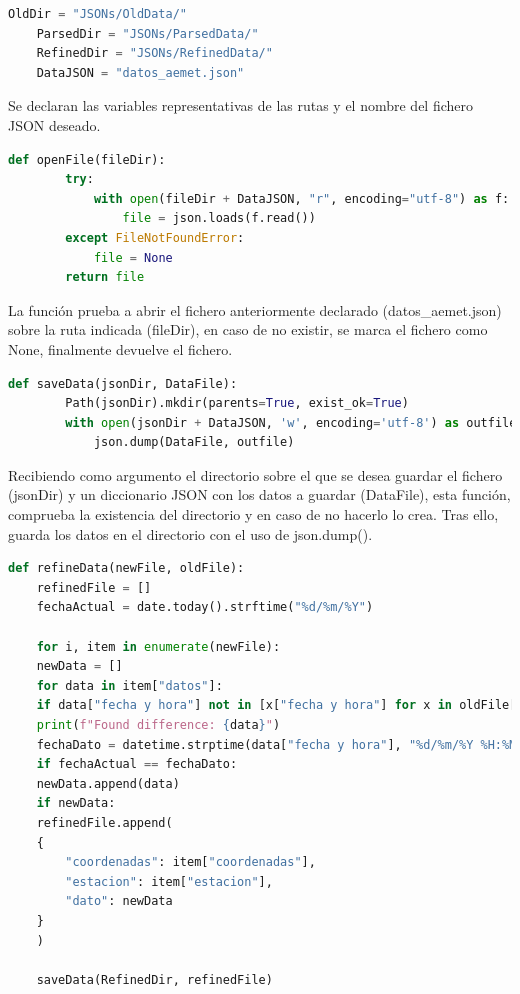 \begin{lstlisting}[language=Python, caption={Declaración rutas JSONs y nombre de fichero}]
	OldDir = "JSONs/OldData/"
	ParsedDir = "JSONs/ParsedData/"
	RefinedDir = "JSONs/RefinedData/"
	DataJSON = "datos_aemet.json"
\end{lstlisting}

Se declaran las variables representativas de las rutas y el nombre del fichero JSON deseado.

\begin{lstlisting}[language=Python, caption={Declaración función openFile()}]
	def openFile(fileDir):
		try:
			with open(fileDir + DataJSON, "r", encoding="utf-8") as f:
				file = json.loads(f.read())
		except FileNotFoundError:
			file = None
		return file
\end{lstlisting}

La función prueba a abrir el fichero anteriormente declarado (datos\_aemet.json) sobre la ruta indicada (fileDir), en caso de no existir, se marca el fichero como None, finalmente devuelve el fichero.

\begin{lstlisting}[language=Python, caption={Declaración función saveFile()}]
	def saveData(jsonDir, DataFile):
		Path(jsonDir).mkdir(parents=True, exist_ok=True)
		with open(jsonDir + DataJSON, 'w', encoding='utf-8') as outfile:
			json.dump(DataFile, outfile)
\end{lstlisting}

Recibiendo como argumento el directorio sobre el que se desea guardar el fichero (jsonDir) y un diccionario JSON con los datos a guardar (DataFile), esta función, comprueba la existencia del directorio y en caso de no hacerlo lo crea. Tras ello, guarda los datos en el directorio con el uso de json.dump().

\begin{lstlisting}[language=Python, caption={Declaración rutas JSONs}]
	def refineData(newFile, oldFile):
	refinedFile = []
	fechaActual = date.today().strftime("%d/%m/%Y")
	
	for i, item in enumerate(newFile):
	newData = []
	for data in item["datos"]:
	if data["fecha y hora"] not in [x["fecha y hora"] for x in oldFile[i]["datos"]]:
	print(f"Found difference: {data}")
	fechaDato = datetime.strptime(data["fecha y hora"], "%d/%m/%Y %H:%M:%S").date().strftime("%d/%m/%Y")
	if fechaActual == fechaDato:
	newData.append(data)
	if newData:
	refinedFile.append(
	{
		"coordenadas": item["coordenadas"],
		"estacion": item["estacion"],
		"dato": newData
	}
	)
	
	saveData(RefinedDir, refinedFile)
\end{lstlisting}

